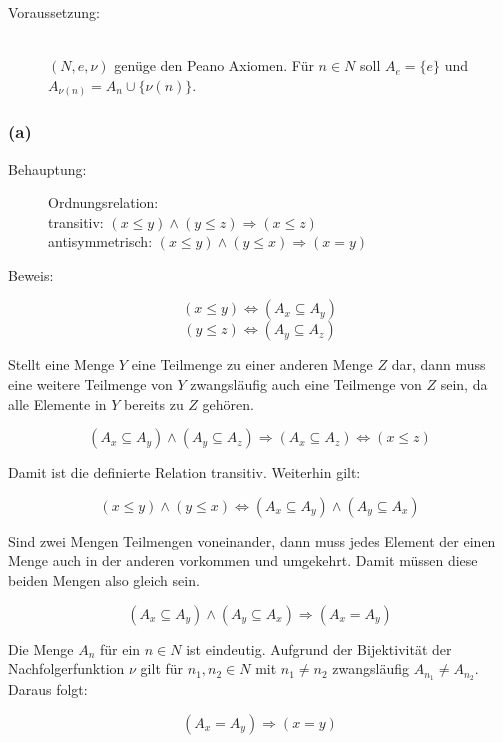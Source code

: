 \documentclass[11pt, a4paper]{article}
\begin{document}
		\begin{description}
			\item[Voraussetzung:] \hfill \\
				$(N,e,\nu)$ genüge den Peano Axiomen. Für $n \in N$ soll $A_e = \{e\}$ und $A_{\nu(n)} = A_n \cup \{\nu(n)\}$.
		\end{description}

	\subsubsection*{(a)}
	
		\begin{description}
			\item[Behauptung:] Ordnungsrelation: \hfill \\
				transitiv: $(x \leq y)\wedge(y \leq z) \Rightarrow (x \leq z)$ \hfill \\
				antisymmetrisch: $(x \leq y)\wedge(y \leq x) \Rightarrow (x = y)$ \hfill
			\item[Beweis:]
		\end{description}

		\[ (x \leq y) \Leftrightarrow (A_x \subseteq A_y) \]
		\[ (y \leq z) \Leftrightarrow (A_y \subseteq A_z) \]

		Stellt eine Menge $Y$ eine Teilmenge zu einer anderen Menge $Z$ dar, dann muss eine weitere Teilmenge von $Y$ zwangsläufig auch eine Teilmenge von $Z$ sein, da alle Elemente in $Y$ bereits zu $Z$ gehören.

		\[ (A_x \subseteq A_y)\wedge(A_y \subseteq A_z) \Rightarrow (A_x \subseteq A_z) \Leftrightarrow (x \leq z) \]

		Damit ist die definierte Relation transitiv. Weiterhin gilt:

		\[ (x \leq y)\wedge(y \leq x) \Leftrightarrow (A_x \subseteq A_y)\wedge(A_y \subseteq A_x) \]

		Sind zwei Mengen Teilmengen voneinander, dann muss jedes Element der einen Menge auch in der anderen vorkommen und umgekehrt. Damit müssen diese beiden Mengen also gleich sein.

		\[ (A_x \subseteq A_y)\wedge(A_y \subseteq A_x) \Rightarrow (A_x = A_y) \]

		Die Menge $A_n$ für ein $n \in N$ ist eindeutig. Aufgrund der Bijektivität der Nachfolgerfunktion $\nu$ gilt für $n_1,n_2 \in N$ mit $n_1 \neq n_2$ zwangsläufig $A_{n_1} \neq A_{n_2}$.
		Daraus folgt:

		\[ (A_x = A_y) \Rightarrow (x = y) \]
\end{document}
